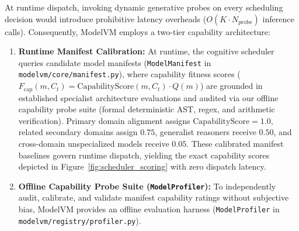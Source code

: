 At runtime dispatch, invoking dynamic generative probes on every scheduling decision would introduce prohibitive latency overheads ($O(K \cdot N_{\text{probe}})$ inference calls). Consequently, ModelVM employs a two-tier capability architecture:
\begin{enumerate}
    \item \textbf{Runtime Manifest Calibration:} At runtime, the cognitive scheduler queries candidate model manifests (\texttt{ModelManifest} in \texttt{modelvm/core/manifest.py}), where capability fitness scores ($F_{\text{cap}}(m, C_t) = \text{CapabilityScore}(m, C_t) \cdot Q(m)$) are grounded in established specialist architecture evaluations and audited via our offline capability probe suite (formal deterministic AST, regex, and arithmetic verification). Primary domain alignment assigns $\text{CapabilityScore}=1.0$, related secondary domains assign $0.75$, generalist reasoners receive $0.50$, and cross-domain unspecialized models receive $0.05$. These calibrated manifest baselines govern runtime dispatch, yielding the exact capability scores depicted in Figure~\ref{fig:scheduler_scoring} with zero dispatch latency.
    \item \textbf{Offline Capability Probe Suite (\texttt{ModelProfiler}):} To independently audit, calibrate, and validate manifest capability ratings without subjective bias, ModelVM provides an offline evaluation harness (\texttt{ModelProfiler} in \texttt{modelvm/registry/profiler.py}).
\end{enumerate}

